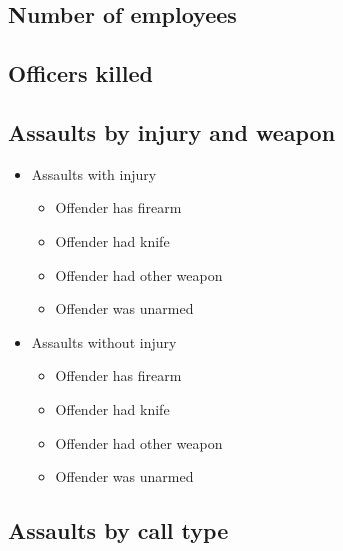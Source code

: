 \documentclass[
  12pt,
  openany]{book}
\providecommand{\tightlist}{%
  \setlength{\itemsep}{0pt}\setlength{\parskip}{0pt}}
\begin{document}
\hypertarget{number-of-employees}{%
\subsection{Number of employees}\label{number-of-employees}}

\hypertarget{officers-killed}{%
\subsection{Officers killed}\label{officers-killed}}

\hypertarget{assaults-by-injury-and-weapon}{%
\subsection{Assaults by injury and weapon}\label{assaults-by-injury-and-weapon}}

\begin{itemize}
\tightlist
\item
  Assaults with injury

  \begin{itemize}
  \tightlist
  \item
    Offender has firearm
  \item
    Offender had knife
  \item
    Offender had other weapon
  \item
    Offender was unarmed
  \end{itemize}
\item
  Assaults without injury

  \begin{itemize}
  \tightlist
  \item
    Offender has firearm
  \item
    Offender had knife
  \item
    Offender had other weapon
  \item
    Offender was unarmed
  \end{itemize}
\end{itemize}

\hypertarget{assaults-by-call-type}{%
\subsection{Assaults by call type}\label{assaults-by-call-type}}
\end{document}
